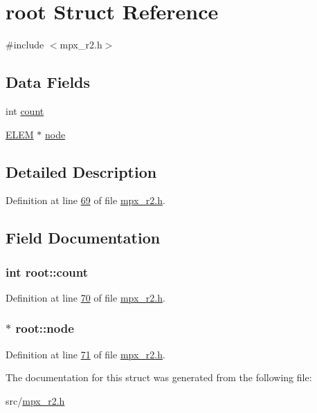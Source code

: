 \hypertarget{structroot}{
\section{root Struct Reference}
\label{structroot}
}


{\ttfamily \#include $<$mpx\_\-r2.h$>$}

\subsection*{Data Fields}
\begin{DoxyCompactItemize}
\item 
int \hyperlink{structroot_afa78d0408d4af29e936332a04739d59c}{count}
\item 
\hyperlink{structpage}{ELEM} $\ast$ \hyperlink{structroot_ac45fb12cfcffd5cf8fba2a0ebd6d6479}{node}
\end{DoxyCompactItemize}


\subsection{Detailed Description}


Definition at line \hyperlink{mpx__r2_8h_source_l00069}{69} of file \hyperlink{mpx__r2_8h_source}{mpx\_\-r2.h}.



\subsection{Field Documentation}
\hypertarget{structroot_afa78d0408d4af29e936332a04739d59c}{
\subsubsection[{count}]{\setlength{\rightskip}{0pt plus 5cm}int {\bf root::count}}}
\label{structroot_afa78d0408d4af29e936332a04739d59c}


Definition at line \hyperlink{mpx__r2_8h_source_l00070}{70} of file \hyperlink{mpx__r2_8h_source}{mpx\_\-r2.h}.

\hypertarget{structroot_ac45fb12cfcffd5cf8fba2a0ebd6d6479}{
\subsubsection[{node}]{$\ast$ {\bf root::node}}}
\label{structroot_ac45fb12cfcffd5cf8fba2a0ebd6d6479}


Definition at line \hyperlink{mpx__r2_8h_source_l00071}{71} of file \hyperlink{mpx__r2_8h_source}{mpx\_\-r2.h}.



The documentation for this struct was generated from the following file:\begin{DoxyCompactItemize}
\item 
src/\hyperlink{mpx__r2_8h}{mpx\_\-r2.h}\end{DoxyCompactItemize}
